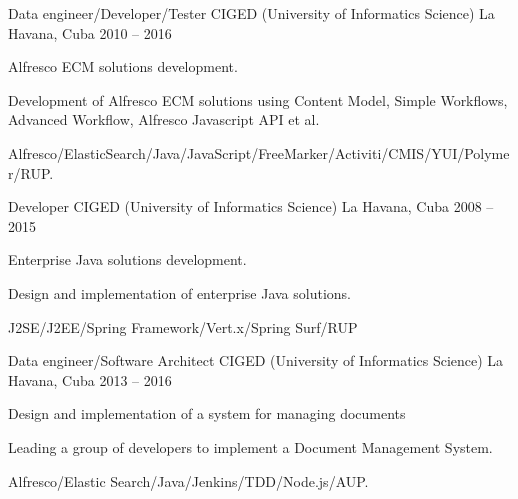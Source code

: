 


\begin{cventries}



\cventry
{Data engineer/Developer/Tester } %
{CIGED (University of Informatics Science)} %
{La Havana, Cuba} %
{2010 – 2016} %
{ %
\begin{cvitems}
\item {Alfresco ECM solutions development.}
\item {Development of Alfresco ECM solutions using Content Model, Simple Workflows, Advanced Workflow, Alfresco Javascript API et al.}
\item {Alfresco/ElasticSearch/Java/JavaScript/FreeMarker/Activiti/CMIS/YUI/Polymer/RUP.}
\end{cvitems}
}


\cventry
{Developer} %
{CIGED (University of Informatics Science)} %
{La Havana, Cuba} %
{2008 – 2015} %
{ %
\begin{cvitems}
\item {Enterprise Java solutions development.}
\item {Design and implementation of enterprise Java solutions.}
\item { J2SE/J2EE/Spring Framework/Vert.x/Spring Surf/RUP}
\end{cvitems}
}


\cventry
{Data engineer/Software Architect } %
{CIGED (University of Informatics Science)} %
{La Havana, Cuba} %
{2013 – 2016} %
{ %
\begin{cvitems}
\item {Design and implementation of a system for managing documents}
\item {Leading a group of developers to implement a Document Management System.}
\item {Alfresco/Elastic Search/Java/Jenkins/TDD/Node.js/AUP.}
\end{cvitems}
}


\end{cventries}
